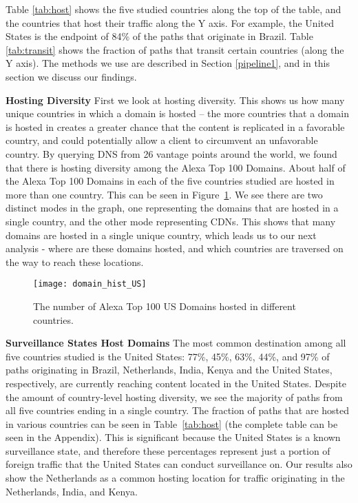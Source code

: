 Table \ref{tab:host} shows the five studied countries along the top of the table, and the countries that host their traffic along the Y axis.  For example, the United States is the endpoint of 84\% of the paths that originate in Brazil.  Table \ref{tab:transit} shows the fraction of paths that transit certain countries (along the Y axis).  The methods we use are described in Section \ref{pipeline1}, and in this section we discuss our findings.

{\bf Hosting Diversity}
First we look at hosting diversity.  This shows us how many unique countries in which a domain is hosted -- the more countries that a domain is hosted in creates a greater chance that the content is replicated in a favorable country, and could potentially allow a client to circumvent an unfavorable country.  By querying DNS from 26 vantage points around the world, we found that there is hosting diversity among the Alexa Top 100 Domains.  About half of the Alexa Top 100 Domains in each of the five countries studied are hosted in more than one country.  This can be seen in Figure~\ref{fig:host_diversity}.  We see there are two distinct modes in the graph, one representing the domains that are hosted in a single country, and the other mode representing CDNs.  This shows that many domains are hosted in a single unique country, which leads us to our next analysis - where are these domains hosted, and which countries are traversed on the way to reach these locations.

\begin{figure}
\centering
\texttt{[image: domain\_hist\_US]}
\caption{The number of Alexa Top 100 US Domains hosted in different countries.}
\label{fig:host_diversity}
\end{figure}

{\bf Surveillance States Host Domains}
The most common destination among all five countries studied is the United States: 77\%, 45\%, 63\%, 44\%, and 97\% of paths originating in Brazil, Netherlands, India, Kenya and the United States, respectively, are currently reaching content located in the United States. Despite the amount of country-level hosting diversity, we see the majority of paths from all five countries ending in a single country.  The fraction of paths that are hosted in various countries can be seen in Table~\ref{tab:host} (the complete table can be seen in the Appendix).  This is significant because the United States is a known surveillance state, and therefore these percentages represent just a portion of foreign traffic that the United States can conduct surveillance on.  Our results also show the Netherlands as a common hosting location for traffic originating in the Netherlands, India, and Kenya.

